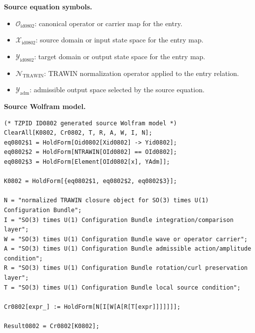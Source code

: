 \begin{minipage}[t]{0.49\linewidth}
\begingroup
\small
\raggedright
\textbf{Source equation symbols.}\par
\begin{itemize}[leftmargin=1.35em,itemsep=1pt,topsep=1pt,parsep=0pt]
    \item $\mathcal{O}_{\mathrm{id0802}}$: canonical operator or carrier map for the entry.
    \item $\mathcal{X}_{\mathrm{id0802}}$: source domain or input state space for the entry map.
    \item $\mathcal{Y}_{\mathrm{id0802}}$: target domain or output state space for the entry map.
    \item $\mathcal{N}_{\mathrm{TRAWIN}}$: TRAWIN normalization operator applied to the entry relation.
    \item $\mathcal{Y}_{\mathrm{adm}}$: admissible output space selected by the source equation.
\end{itemize}
\endgroup
\end{minipage}\hfill
\begin{minipage}[t]{0.47\linewidth}
\begingroup
\scriptsize
\raggedright
\textbf{Source Wolfram model.}\par
\begin{Verbatim}[fontsize=\tiny,breaklines=true,breakanywhere=true]
(* TZPID ID0802 generated source Wolfram model *)
ClearAll[K0802, Cr0802, T, R, A, W, I, N];
eq0802$1 = HoldForm[Oid0802[Xid0802] -> Yid0802];
eq0802$2 = HoldForm[NTRAWIN[OId0802] == OId0802];
eq0802$3 = HoldForm[Element[OId0802[x], YAdm]];

K0802 = HoldForm[{eq0802$1, eq0802$2, eq0802$3}];

N = "normalized TRAWIN closure object for SO(3) times U(1) Configuration Bundle";
I = "SO(3) times U(1) Configuration Bundle integration/comparison layer";
W = "SO(3) times U(1) Configuration Bundle wave or operator carrier";
A = "SO(3) times U(1) Configuration Bundle admissible action/amplitude condition";
R = "SO(3) times U(1) Configuration Bundle rotation/curl preservation layer";
T = "SO(3) times U(1) Configuration Bundle local source condition";

Cr0802[expr_] := HoldForm[N[I[W[A[R[T[expr]]]]]]];

Result0802 = Cr0802[K0802];
\end{Verbatim}
\endgroup
\end{minipage}

